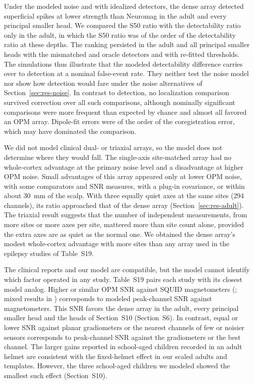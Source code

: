 \documentclass[preprint,12pt,authoryear,a4paper]{elsarticle}
\begin{document}
Under the modeled noise and with idealized detectors, the dense array detected superficial spikes at lower strength than Neuromag in the adult and every principal smaller head. We compared the S50 ratio with the detectability ratio only in the adult, in which the S50 ratio was of the order of the detectability ratio at these depths. The ranking persisted in the adult and all principal smaller heads with the mismatched and oracle detectors and with re-fitted thresholds. The simulations thus illustrate that the modeled detectability difference carries over to detection at a nominal false-event rate. They neither test the noise model nor show how detection would fare under the noise alternatives of Section~\ref{sec:res-noise}. In contrast to detection, no localization comparison survived correction over all such comparisons, although nominally significant comparisons were more frequent than expected by chance and almost all favored an OPM array. Dipole-fit errors were of the order of the coregistration error, which may have dominated the comparison.

We did not model clinical dual- or triaxial arrays, so the model does not determine where they would fall. The single-axis site-matched array had no whole-cortex advantage at the primary noise level and a disadvantage at higher OPM noise. Small advantages of this array appeared only at lower OPM noise, with some comparators and SNR measures, with a plug-in covariance, or within about 30~mm of the scalp. With three equally quiet axes at the same sites (294 channels), its ratio approached that of the dense array (Section~\ref{sec:res-adult}). The triaxial result suggests that the number of independent measurements, from more sites or more axes per site, mattered more than site count alone, provided the extra axes are as quiet as the normal one. We obtained the dense array's modest whole-cortex advantage with more sites than any array used in the epilepsy studies of Table~S19.

The clinical reports and our model are compatible, but the model cannot identify which factor operated in any study. Table~S19 pairs each study with its closest model analog. Higher or similar OPM SNR against SQUID magnetometers (\citealp{feys2022}; mixed results in \citealp{feys2025}) corresponds to modeled peak-channel SNR against magnetometers. This SNR favors the dense array in the adult, every principal smaller head and the heads of Section~S10 (Section~S6). In contrast, equal or lower SNR against planar gradiometers or the nearest channels of few or noisier sensors \citep{hillebrand2023,schwartz2025} corresponds to peak-channel SNR against the gradiometers or the best channel. The larger gains reported in school-aged children recorded in an adult helmet \citep{feys2022} are consistent with the fixed-helmet effect in our scaled adults and templates. However, the three school-aged children we modeled showed the smallest such effect (Section~S10).
\end{document}
